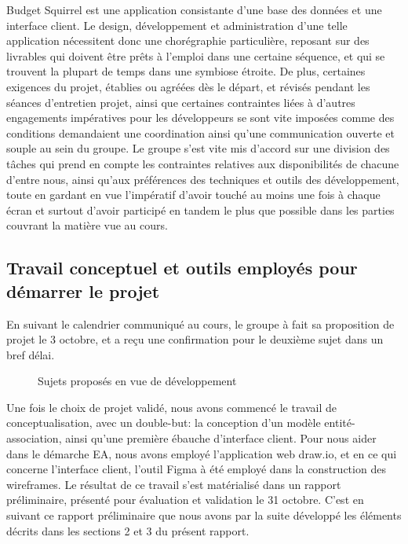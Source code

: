 \documentclass[a4paper,12pt]{article}
\begin{document}
Budget Squirrel est une application consistante d'une base des données et une interface client. Le design, développement et administration d'une telle application nécessitent donc une chorégraphie particulière, reposant sur des livrables qui doivent être prêts à l'emploi dans une certaine séquence, et qui se trouvent la plupart de temps dans une symbiose étroite. De plus, certaines exigences du projet, établies ou agréées dès le départ, et révisés pendant les séances d'entretien projet, ainsi que certaines contraintes liées à d'autres engagements impératives pour les développeurs se sont vite imposées comme des conditions demandaient une coordination ainsi qu'une communication ouverte et souple au sein du groupe. Le groupe s'est vite mis d'accord sur une division des tâches qui prend en compte les contraintes relatives aux disponibilités de chacune d'entre nous, ainsi qu'aux préférences des techniques et outils des développement, toute en gardant en vue l'impératif d'avoir touché au moins une fois à chaque écran et surtout d'avoir participé en tandem le plus que possible dans les parties couvrant la matière vue au cours.

\subsection {Travail conceptuel et outils employés pour démarrer le projet}

En suivant le calendrier communiqué au cours, le groupe à fait sa proposition de projet le 3 octobre, et a reçu une confirmation pour le deuxième sujet dans un bref délai.

\begin{figure}[!ht]
\noindent
{}
\caption{\footnotesize{Sujets proposés en vue de développement}}
\end{figure}

Une fois le choix de projet validé, nous avons commencé le travail de conceptualisation, avec un double-but: la conception d'un modèle entité-association, ainsi qu'une première ébauche d'interface client. Pour nous aider dans le démarche EA, nous avons employé l'application web draw.io, et en ce qui concerne l'interface client, l'outil Figma à été employé dans la construction des wireframes. Le résultat de ce travail s'est matérialisé dans un rapport préliminaire, présenté pour évaluation et validation le 31 octobre. C'est en suivant ce rapport préliminaire  que nous avons par la suite développé les éléments décrits dans les sections 2 et 3 du présent rapport.
 
\end{document}
